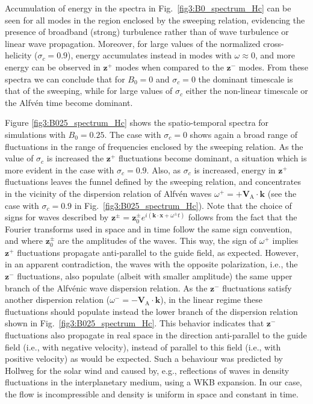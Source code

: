 \documentclass[aip,pop,reprint,amsmath,amssymb,floatfix]{revtex4-1}
\renewcommand{\vec}[1]{\mathbf{#1}}
\begin{document}
Accumulation of energy in the spectra in
Fig.~\ref{fig3:B0_spectrum_Hc} can be seen for all modes in the region
enclosed by the sweeping relation, evidencing the presence of
broadband (strong) turbulence rather than of wave turbulence or linear
wave propagation. Moreover, for large values of the normalized
cross-helicity ($\sigma_c = 0.9$), energy accumulates instead in modes
with $\omega\approx 0$, and more energy can be observed in $\vec{z}^+$
modes when compared to the $\vec{z}^-$ modes. From these spectra we
can conclude that for $B_0=0$ and $\sigma_c=0$ the dominant timescale
is that of the sweeping, while for large values of $\sigma_c$ either
the non-linear timescale or the Alfv\'en time become dominant.

Figure \ref{fig3:B025_spectrum_Hc} shows the spatio-temporal spectra
for simulations with $B_0=0.25$. The case with $\sigma_c=0$ shows
again a broad range of fluctuations in the range of frequencies
enclosed by the sweeping relation. As the value of $\sigma_c$ is
increased the $\vec{z}^+$ fluctuations become dominant, a situation
which is more evident in the case with $\sigma_c=0.9$. Also, as
$\sigma_c$ is increased, energy in $\vec{z}^+$ fluctuations leaves the
funnel defined by the sweeping relation, and concentrates in the
vicinity of the dispersion relation of Alfv\'en waves $\omega^+ =
+\vec{V}_\textrm{A} \cdot \vec{k}$ (see the case with $\sigma_c=0.9$
in Fig.~\ref{fig3:B025_spectrum_Hc}). Note that the choice of signs
for waves described by $\vec{z}^\pm={\vec z}_0^\pm e^{i(\vec{k} \cdot
  \vec{x}+\omega^\pm t)}$ follows from the fact that the Fourier
transforms used in space and in time follow the same sign convention,
and where ${\vec z}_0^\pm$ are the amplitudes of the waves.  This way,
the sign of $\omega^+$ implies $\vec{z}^+$ fluctuations propagate
anti-parallel to the guide field, as expected. However, in an apparent
contradiction, the waves with the opposite polarization, i.e., the
$\vec{z}^-$ fluctuations, also populate (albeit with smaller
amplitude) the same upper branch of the Alfv\'enic wave dispersion
relation. As the $\vec{z}^-$ fluctuations satisfy another dispersion
relation ($\omega^- = -\vec{V}_\textrm{A} \cdot \vec{k}$), in the
linear regime these fluctuations should populate instead the lower
branch of the dispersion relation shown in
Fig.~\ref{fig3:B025_spectrum_Hc}. This behavior indicates that
$\vec{z}^-$ fluctuations also propagate in real space in the direction
anti-parallel to the guide field (i.e., with negative velocity),
instead of parallel to this field (i.e., with positive velocity) as
would be expected. Such a behaviour was predicted by Hollweg
\cite{hollweg_1990_wkb} for the solar wind and caused by, e.g.,
reflections of waves in density fluctuations in the interplanetary
medium, using a WKB expansion. In our case, the flow is incompressible
and density is uniform in space and constant in time.
\end{document}
